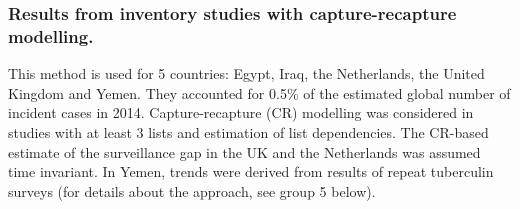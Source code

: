 \subsubsection {Results from inventory studies with capture-recapture modelling\cite{WHO2012}.} This method is used for 5 countries: Egypt, Iraq, the Netherlands, the United Kingdom and Yemen. They accounted for 0.5\% of the estimated global number of incident cases in 2014. Capture-recapture (CR) modelling was considered in studies with at least 3 lists and estimation of list dependencies. The CR-based estimate of the surveillance gap in the UK and the Netherlands was assumed time invariant. In Yemen, trends were derived from results of repeat tuberculin surveys (for details about the approach, see group 5 below). 

